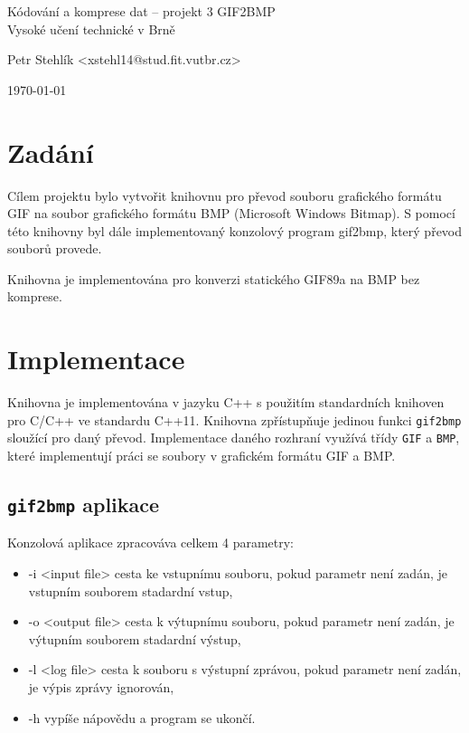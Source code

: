 \documentclass[11pt,a4paper]{article}
\begin{document}
\begin{center}
	\LARGE{Kódování a komprese dat -- projekt 3 GIF2BMP}\\
	\large{Vysoké učení technické v Brně}
	\vspace{0.5cm}

	Petr Stehlík <xstehl14@stud.fit.vutbr.cz>

	\vspace{0.5cm}

	\today

\end{center}

\section{Zadání}
Cílem projektu bylo vytvořit knihovnu pro převod souboru grafického formátu GIF na soubor grafického formátu BMP (Microsoft Windows Bitmap). S pomocí této knihovny byl dále implementovaný konzolový program gif2bmp, který převod souborů provede.

Knihovna je implementována pro konverzi statického GIF89a na BMP bez komprese.

\section{Implementace}
Knihovna je implementována v jazyku C++ s použitím standardních knihoven pro C/C++ ve standardu C++11. Knihovna zpřístupňuje jedinou funkci \texttt{gif2bmp} sloužící pro daný převod. Implementace daného rozhraní využívá třídy \texttt{GIF} a \texttt{BMP}, které implementují práci se soubory v grafickém formátu GIF a BMP.

\subsection{\texttt{gif2bmp} aplikace}

Konzolová aplikace zpracováva celkem 4 parametry:

\begin{itemize}
	\item{-i <input file> cesta ke vstupnímu souboru, pokud parametr není zadán, je vstupním souborem stadardní vstup,}
	\item{-o <output file> cesta k výtupnímu souboru, pokud parametr není zadán, je výtupním souborem stadardní výstup,}
	\item{-l <log file> cesta k souboru s výstupní zprávou, pokud parametr není zadán, je výpis zprávy ignorován,}
	\item{-h vypíše nápovědu a program se ukončí.}
\end{itemize}
\end{document}
